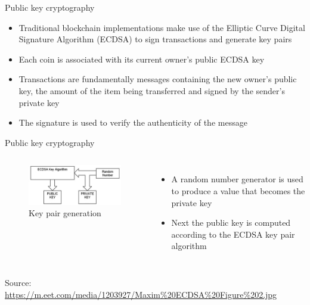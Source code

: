 \documentclass[9pt]{beamer}
\begin{document}

\begin{frame}{Public key cryptography}
	\begin{itemize}
		\item Traditional blockchain implementations make use of the Elliptic Curve Digital Signature Algorithm (ECDSA) to sign transactions and generate key pairs
		\item Each coin is associated with its current owner's public ECDSA key
		\item Transactions are fundamentally messages containing the new owner's public key, the amount of the item being transferred and signed by the sender's private key
		\item The signature is used to verify the authenticity of the message
	\end{itemize}
\end{frame}


\begin{frame}{Public key cryptography}
	\begin{columns}
		\begin{figure}[]
			\centering
			\includegraphics  [scale=0.4]{Images/ECDSA3}
			\caption{Key pair generation}
		\end{figure}
		\begin{itemize}
			\item A random number generator is used to produce a value that becomes the private key
			\item Next the public key is computed according to the ECDSA key pair algorithm
		\end{itemize}
	\end{columns}
	\begin{tiny}
		Source: \href{https://eng.paxos.com/blockchain-separating-hype-from-substance-part-2}{https://m.eet.com/media/1203927/Maxim\%20ECDSA\%20Figure\%202.jpg}
	\end{tiny}
\end{frame}
\end{document}
